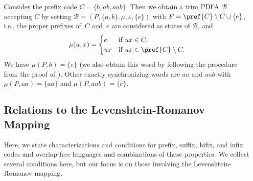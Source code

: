 \begin{example}\label{constrsync:ex:exact-sync}
	Consider the prefix code $C = \{b,ab,aab\}$.
	Then we obtain a trim PDFA $\mathcal B$ 
	accepting $C$ by setting $\mathcal B = (P, \{a,b\}, \mu, \varepsilon, \{e\})$ with $P = \pref{C}\setminus C \cup \{e\}$, i.e., the proper prefixes
	of~$C$ and~$e$ are considered as states of $\mathcal B$,
	and 
	\[
	\mu(u, x) = \begin{cases}
		e   & \text{if } ux \in C, \\
		ux  & \text{if } ux \in \pref{C} \setminus C.
	\end{cases}
	\]
	We have $\mu(P, b) = \{e\}$ (we also obtain this word by following the procedure from the proof of 
	).
	Other exactly synchronizing words are $aa$ and $aab$ with $\mu(P, aa) = \{aa\}$ and $\mu(P, aab) = \{e\}$.
\end{example}

\subsection{Relations to the Levenshtein-Romanov Mapping}
\label{constrsync:sec:codes:levensthein-romanov}

Here, we state characterizations and conditions for prefix, suffix, bifix, and infix codes
and overlap-free languages and combinations of these properties. We collect
several conditions here, but our focus is on those involving the Levenshtein-Romanov mapping.

